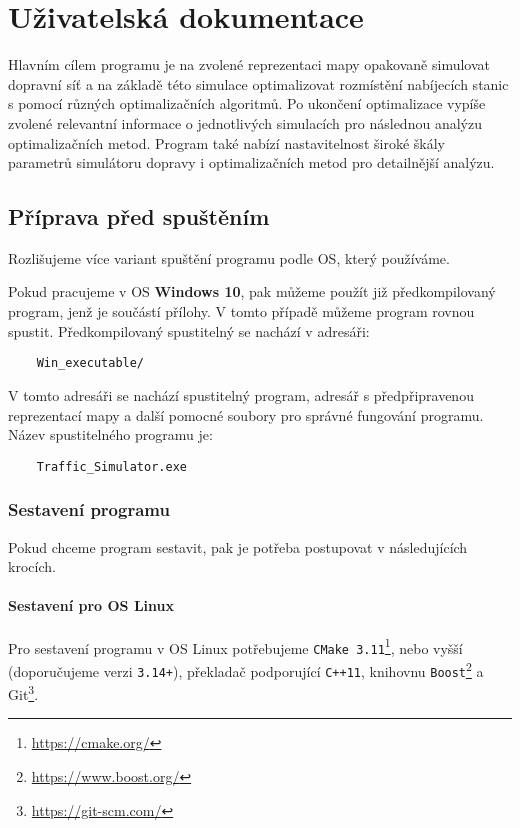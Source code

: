 \chapter{Uživatelská dokumentace}
\label{chap:uzivatelska_dokumentace}

Hlavním cílem programu je na zvolené reprezentaci mapy opakovaně simulovat 
dopravní síť a na základě této simulace optimalizovat rozmístění nabíjecích
stanic s pomocí různých optimalizačních algoritmů. Po ukončení optimalizace
vypíše zvolené relevantní informace o jednotlivých simulacích pro následnou 
analýzu optimalizačních metod. Program také nabízí nastavitelnost široké škály 
parametrů simulátoru dopravy i optimalizačních  metod pro detailnější analýzu.


\section{Příprava před spuštěním}
Rozlišujeme více variant spuštění programu podle OS, který používáme.

Pokud pracujeme v OS \textbf{Windows 10}, pak můžeme použít již předkompilovaný 
program, jenž je součástí přílohy. V tomto případě můžeme program rovnou spustit.
Předkompilovaný spustitelný se nachází v adresáři:

\begin{verbatim}
    Win_executable/
\end{verbatim}

V tomto adresáři se nachází spustitelný program, adresář s předpřipravenou
reprezentací mapy a další pomocné soubory pro správné fungování programu.
Název spustitelného programu je:

\begin{verbatim}
    Traffic_Simulator.exe 
\end{verbatim}

\subsection{Sestavení programu}
Pokud chceme program sestavit, pak je potřeba postupovat v následujících krocích.

\subsubsection{Sestavení pro OS Linux}

Pro sestavení programu v OS Linux potřebujeme
\texttt{CMake 3.11}\footnote{\url{https://cmake.org/}}, 
nebo vyšší (doporučujeme verzi \texttt{3.14+}), překladač podporující \texttt{C++11},
knihovnu \texttt{Boost}\footnote{\url{https://www.boost.org/}} a
Git\footnote{\url{https://git-scm.com/}}.


